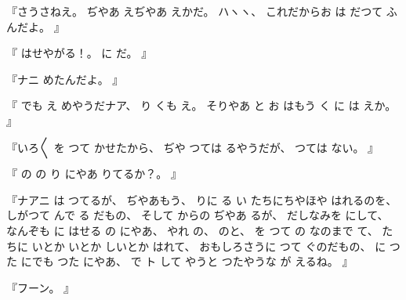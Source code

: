 %
『さうさねえ。
%
ぢやあ
えぢやあ
えかだ。
%
ハヽヽ、
%
これだからお
は
だつて
ふんだよ。
』

%
『
はせやがる！。
%
に
だ。
』

%
『ナニ
めたんだよ。
』

%
『
でも
え
めやうだナア、
%
り
くも
え。
%
そりやあ
と
お
はもう
く
に
は
えか。
』

%
『いろ〳〵
を
つて
かせたから、
%
ぢや
つては
るやうだが、
%
つては
ない。
』

%
『
の
の
り
にやあ
りてるか？。
』

%
『ナアニ
は
つてるが、
%
ぢやあもう、
%
りに
る
い
たちにちやほや
はれるのを、
%
しがつて
んで
る
だもの、
%
そして
からの
ぢやあ
るが、
%
だしなみを
にして、
%
なんぞも
に
はせる
の
にやあ、
%
やれ
の、
%
のと、
%
を
つて
の
なのまで
て、
%
たちに
いとか
いとか
しいとか
はれて、
%
おもしろさうに
つて
ぐのだもの、
%
に
つた
にでも
つた
にやあ、
%
で
ト
して
やうと
つたやうな
が
えるね。
』

%
『フーン。
』

